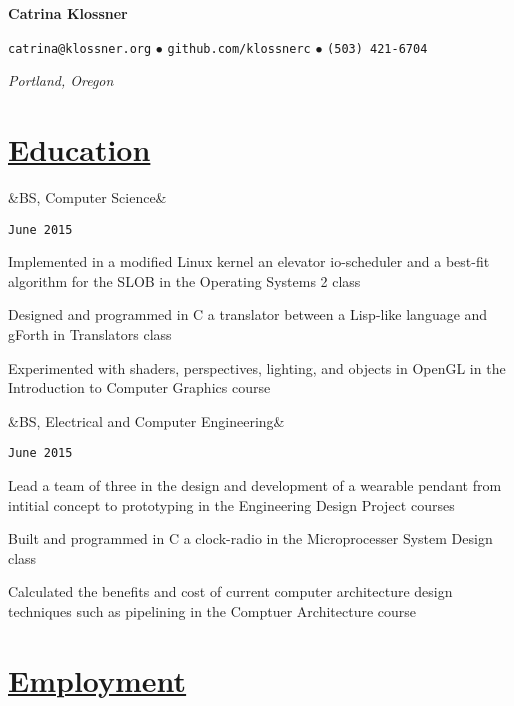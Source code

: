 \documentclass[11pt]{article}
\newcommand{\heading}[1]{
    \section*{\uline{\hfill #1}}
}
\newcommand{\squish}{
    \setlength{\itemsep}{0.5pt}
    \setlength{\parskip}{0pt}
    \setlength{\parsep}{0.5pt}
}
\newcommand{\when}[1]{
    \hfill \texttt{#1}
}
\newcommand{\experience}[3]{
    \ifx&#2&
        \item[{#1}]
    \else
        \item[{#1}, \emph{#2}]
    \fi
    \when{#3}
}
\newcommand{\contact}[4]{
    \centerline{
        \large       
        \texttt{#1}
        $\bullet$
        \texttt{#2}
        $\bullet$
        \texttt{#3}
    }
    \centerline{
        \emph{#4}
    }
}
\newcommand{\skill}[2]{
    \textbf{#1} \hfill #2
}
\newcommand{\CPP}{
    C\hspace{-.05em}\raisebox{.4ex}{\tiny\bf +}\hspace{-.10em}\raisebox{.4ex}{\tiny\bf +}
}
\begin{document}
\centerline{{\Huge \bf Catrina Klossner}}
\bigskip

\contact{catrina@klossner.org}
        {github.com/klossnerc}
        {(503) 421-6704}
        {Portland, Oregon}

%
%
%
%

\heading{Education}%

\begin{description}
\squish   
\experience{Oregon State University}
           {BS, Computer Science}
           {June 2015}

	Implemented in a modified Linux kernel an elevator io-scheduler and a best-fit algorithm for the SLOB in the Operating Systems 2 class

	Designed and programmed in C a translator between a Lisp-like language and gForth in Translators class

	Experimented with shaders, perspectives, lighting, and objects in OpenGL in the Introduction to Computer Graphics course


\experience{Oregon State University}
           {BS, Electrical and Computer Engineering}
           {June 2015}

	Lead a team of three in the design and development of a wearable pendant from intitial concept to prototyping in the Engineering Design Project courses

	Built and programmed in C a clock-radio in the Microprocesser System Design class

	Calculated the benefits and cost of current computer architecture design techniques such as pipelining in the Comptuer Architecture course


\end{description}

\heading{Employment}%
\end{document}
